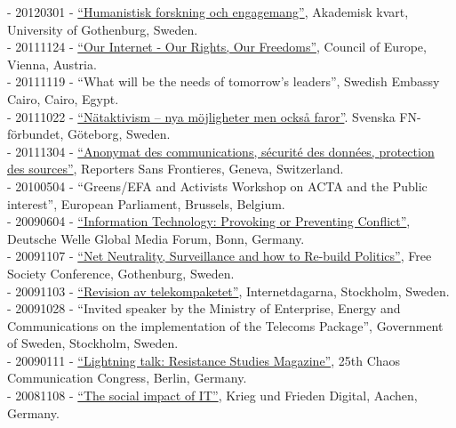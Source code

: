 \documentclass[a4paper,11pt,oneside]{article}
\begin{document}
{    - 20120301 - \href{http://www.youtube.com/watch?v=-HYfVmanye8}{``Humanistisk forskning och engagemang''}, Akademisk kvart, University of Gothenburg, Sweden. \\
    - 20111124 - \href{https://www.youtube.com/watch?v=zWROWpMaKmE}{``Our Internet - Our Rights, Our Freedoms''}, Council of Europe, Vienna, Austria. \\
    - 20111119 - ``What will be the needs of tomorrow's leaders'', Swedish Embassy Cairo, Cairo, Egypt. \\
    - 20111022 - \href{http://www.youtube.com/watch?v=6Mi0g93ModU}{``Nätaktivism – nya möjligheter men också faror''}. Svenska FN-förbundet, Göteborg, Sweden. \\
    - 20111304 - \href{http://www.rsf-ch.ch/anonymat-des-communications-s%C3%A9curit%C3%A9-des-donn%C3%A9es-protection-des-sources-0}{``Anonymat des communications, sécurité des données, protection des sources''}, Reporters Sans Frontieres, Geneva, Switzerland. \\
    - 20100504 - ``Greens/EFA and Activists Workshop on ACTA and the Public interest'', European Parliament, Brussels, Belgium. \\
    - 20090604 - \href{https://issuu.com/deutsche-welle/docs/program-deutsche-welle-global-media-forum-2009}{``Information Technology: Provoking or Preventing Conflict''}, Deutsche Welle Global Media Forum, Bonn, Germany. \\
    - 20091107 - \href{https://vimeo.com/10286077}{``Net Neutrality, Surveillance and how to Re-build Politics''}, Free Society Conference, Gothenburg, Sweden. \\
    - 20091103 - \href{https://internetdagarna.se/arkiv/2009/program-2009/3-november.html}{``Revision av telekompaketet''}, Internetdagarna, Stockholm, Sweden. \\
    - 20091028 - ``Invited speaker by the Ministry of Enterprise, Energy and Communications on the implementation of the Telecoms Package'', Government of Sweden, Stockholm, Sweden.\\
    - 20090111 - \href{https://www.youtube.com/watch?v=G9cXIKvywvs}{``Lightning talk: Resistance Studies Magazine''}, 25th Chaos Communication Congress, Berlin, Germany.\\
    - 20081108 - \href{http://www.fiff.de/veranstaltungen/fiff-jahrestagungen/fiff-jahrestagung-2008-krieg-und-frieden-digital/Programmheft.pdf/at_download/file}{``The social impact of IT''}, Krieg und Frieden Digital, Aachen, Germany.



}
\end{document}

